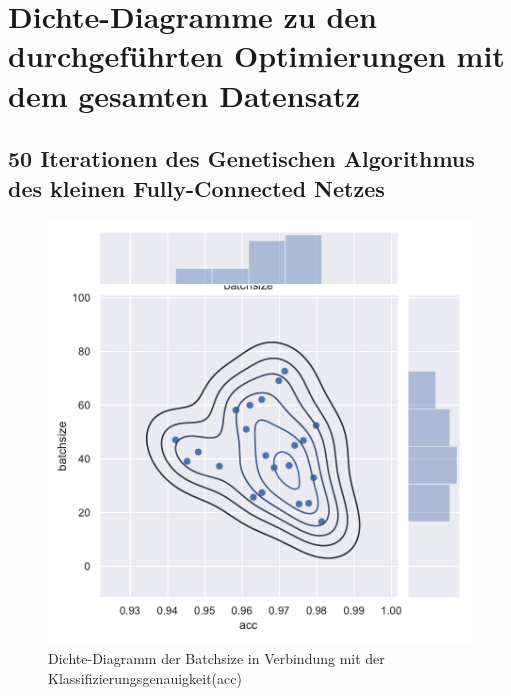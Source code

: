 \section{Dichte-Diagramme zu den durchgeführten Optimierungen mit dem gesamten Datensatz}

\subsection{50 Iterationen des Genetischen Algorithmus des kleinen Fully-Connected Netzes}
\begin{figure}[H]
  \centering  
  \includegraphics[scale=0.5]{anhang/GA_50_mnist_digits_False_small_jointplot_batchsize.pdf}
  \caption{Dichte-Diagramm der Batchsize in Verbindung mit der Klassifizierungsgenauigkeit(acc)}
  
\end{figure}

